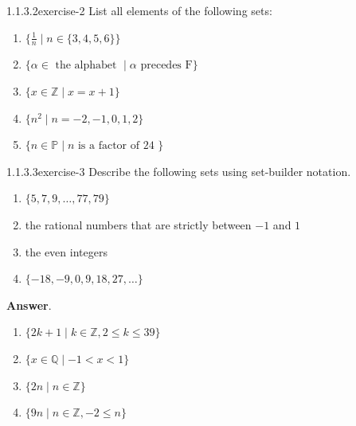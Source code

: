 \documentclass[twoside,10pt,]{book}
\numberwithin{equation}{section}
\begin{document}
\begin{divisionsolution}{1.1.3.2}{}{exercise-2}%
\hypertarget{p-192}{}%
List all elements of the following sets:%
\par
\hypertarget{p-193}{}%
\leavevmode%
\begin{enumerate}[label=(\alph*)]
\item\hypertarget{li-158}{}\hypertarget{p-194}{}%
\(\{\frac{1}{n} \mid n \in \{3,4,5,6\}\}\)%
\item\hypertarget{li-159}{}\hypertarget{p-195}{}%
\(\{\alpha \in  \textrm{ the alphabet } \mid  \alpha \textrm{ precedes F}\}\)%
\item\hypertarget{li-160}{}\hypertarget{p-196}{}%
\(\{x \in \mathbb{Z} \mid x = x+1 \}\)%
\item\hypertarget{li-161}{}\hypertarget{p-197}{}%
\(\{n^2 \mid  n = -2, -1, 0, 1, 2\}\)%
\item\hypertarget{li-162}{}\hypertarget{p-198}{}%
\(\{n \in  \mathbb{P} \mid n \textrm{ is a  factor of  24 }\}\)%
\end{enumerate}
%
\end{divisionsolution}%
\begin{divisionsolution}{1.1.3.3}{}{exercise-3}%
\hypertarget{p-199}{}%
Describe the following sets using set-builder notation.\leavevmode%
\begin{enumerate}[label=(\alph*)]
\item\hypertarget{li-163}{}\hypertarget{p-200}{}%
\(\{ 5, 7, 9, \dots , 77, 79\}\)%
\item\hypertarget{li-164}{}\hypertarget{p-201}{}%
the rational numbers that are strictly between \(-1\) and \(1\)%
\item\hypertarget{li-165}{}\hypertarget{p-202}{}%
the even integers%
\item\hypertarget{li-166}{}\hypertarget{p-203}{}%
\(\{-18, -9,0,9, 18,27, \dots \}\)%
\end{enumerate}
%
\par\smallskip%
\noindent\textbf{Answer}.\quad%
\hypertarget{p-204}{}%
\leavevmode%
\begin{enumerate}[label=(\alph*)]
\item\hypertarget{li-167}{}\hypertarget{p-205}{}%
\(\{2k + 1 \mid k \in  \mathbb{Z}, 2 \leqslant  k \leqslant  39\}\)%
\item\hypertarget{li-168}{}\hypertarget{p-206}{}%
\(\{x \in \mathbb{Q}\mid  -1 < x < 1\}\)%
\item\hypertarget{li-169}{}\hypertarget{p-207}{}%
\(\{2n\mid n \in  \mathbb{Z}\}\)%
\item\hypertarget{li-170}{}\hypertarget{p-208}{}%
\(\{9n\mid n \in \mathbb{Z}, -2 \leq  n\}\)%
\end{enumerate}
%
\end{divisionsolution}%
\end{document}

